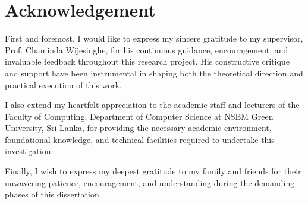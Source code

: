 \thispagestyle{plain}
\chapter*{Acknowledgement}

\noindent First and foremost, I would like to express my sincere gratitude to my supervisor, Prof. Chaminda Wijesinghe, for his continuous guidance, encouragement, and invaluable feedback throughout this research project. His constructive critique and support have been instrumental in shaping both the theoretical direction and practical execution of this work.

\vspace{0.5cm}

\noindent I also extend my heartfelt appreciation to the academic staff and lecturers of the Faculty of Computing, Department of Computer Science at NSBM Green University, Sri Lanka, for providing the necessary academic environment, foundational knowledge, and technical facilities required to undertake this investigation.

\vspace{0.5cm}

\noindent Finally, I wish to express my deepest gratitude to my family and friends for their unwavering patience, encouragement, and understanding during the demanding phases of this dissertation.
